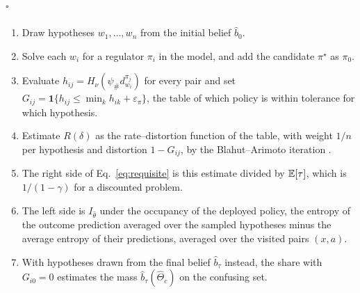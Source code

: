 \hfill$\square$

\paragraph{}
\begingroup\color{red}
\begin{enumerate}
  \item Draw hypotheses $w_1, \dots, w_n$ from the initial belief $\hat b_0$.
  \item Solve each $w_i$ for a regulator $\pi_i$ in the model, and add the candidate $\pi^\star$ as $\pi_0$.
  \item Evaluate $h_{ij} = H_\nu(\psi_\# d^{\pi_j}_{w_i})$ for every pair and set $G_{ij} = \mathbf 1\{h_{ij} \le \min_k h_{ik} + \varepsilon_\pi\}$, the table of which policy is within tolerance for which hypothesis.
  \item Estimate $R(\delta)$ as the rate--distortion function of the table, with weight $1/n$ per hypothesis and distortion $1 - G_{ij}$, by the Blahut--Arimoto iteration \citep{Cover-elements06}.
  \item The right side of Eq.~\eqref{eq:requisite} is this estimate divided by $\mathbb E[\tau]$, which is $1/(1-\gamma)$ for a discounted problem.
  \item The left side is $I_{\hat\theta}$ under the occupancy of the deployed policy, the entropy of the outcome prediction averaged over the sampled hypotheses minus the average entropy of their predictions, averaged over the visited pairs $(x, a)$.
  \item With hypotheses drawn from the final belief $\hat b_\tau$ instead, the share with $G_{i0} = 0$ estimates the mass $\hat b_\tau(\hat\Theta_c)$ on the confusing set.
\end{enumerate}
\endgroup
{}
